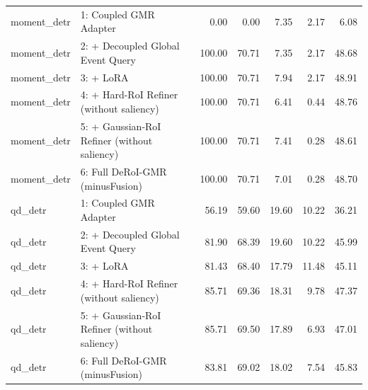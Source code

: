\begin{table}[t]
\begin{tabular}{llrrrrr}
moment\_detr & 1: Coupled GMR Adapter & 0.00 & 0.00 & 7.35 & 2.17 & 6.08 \\
moment\_detr & 2: + Decoupled Global Event Query & 100.00 & 70.71 & 7.35 & 2.17 & 48.68 \\
moment\_detr & 3: + LoRA & 100.00 & 70.71 & 7.94 & 2.17 & 48.91 \\
moment\_detr & 4: + Hard-RoI Refiner (without saliency) & 100.00 & 70.71 & 6.41 & 0.44 & 48.76 \\
moment\_detr & 5: + Gaussian-RoI Refiner (without saliency) & 100.00 & 70.71 & 7.41 & 0.28 & 48.61 \\
moment\_detr & 6: Full DeRoI-GMR (minusFusion) & 100.00 & 70.71 & 7.01 & 0.28 & 48.70 \\
qd\_detr & 1: Coupled GMR Adapter & 56.19 & 59.60 & 19.60 & 10.22 & 36.21 \\
qd\_detr & 2: + Decoupled Global Event Query & 81.90 & 68.39 & 19.60 & 10.22 & 45.99 \\
qd\_detr & 3: + LoRA & 81.43 & 68.40 & 17.79 & 11.48 & 45.11 \\
qd\_detr & 4: + Hard-RoI Refiner (without saliency) & 85.71 & 69.36 & 18.31 & 9.78 & 47.37 \\
qd\_detr & 5: + Gaussian-RoI Refiner (without saliency) & 85.71 & 69.50 & 17.89 & 6.93 & 47.01 \\
qd\_detr & 6: Full DeRoI-GMR (minusFusion) & 83.81 & 69.02 & 18.02 & 7.54 & 45.83 \\
\hline
\end{tabular}
\end{table}
